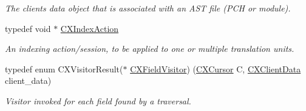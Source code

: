 \begin{DoxyCompactItemize}
\begin{DoxyCompactList}\small\item\em The client\textquotesingle{}s data object that is associated with an A\+ST file (P\+CH or module). \end{DoxyCompactList}\item 
\mbox{\label{group__CINDEX__HIGH_gac8d30d3e3fb34d887b611e7c6de3afb6}} 
typedef void $\ast$ \mbox{\hyperlink{group__CINDEX__HIGH_gac8d30d3e3fb34d887b611e7c6de3afb6}{C\+X\+Index\+Action}}
\begin{DoxyCompactList}\small\item\em An indexing action/session, to be applied to one or multiple translation units. \end{DoxyCompactList}\item 
typedef enum C\+X\+Visitor\+Result($\ast$ \mbox{\hyperlink{group__CINDEX__HIGH_ga5040863c91d7a720a97569cf869f42a4}{C\+X\+Field\+Visitor}}) (\mbox{\hyperlink{structCXCursor}{C\+X\+Cursor}} C, \mbox{\hyperlink{group__CINDEX_gacfa40c3de26d228c0d898403c2c21612}{C\+X\+Client\+Data}} client\+\_\+data)
\begin{DoxyCompactList}\small\item\em Visitor invoked for each field found by a traversal. \end{DoxyCompactList}\end{DoxyCompactItemize}

